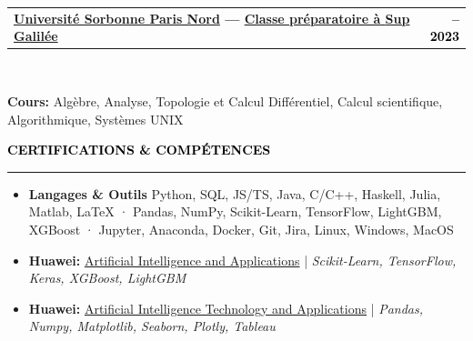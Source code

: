 \documentclass[10pt,english,french]{article}
\makeatletter
\newlength{\mpwidth}
\newcommand{\cvsection}[1]{
    \vspace{4pt}
    \textbf{\fontsize{9pt}{10pt}\selectfont \textcolor{black}{#1}}
    \vspace{6pt}
    \hrule
    \vspace{6pt}
}
\newcommand{\cvtextnotab}[1]{
    \parbox{1\mpwidth}{#1}
}
\newcommand{\cvevent}[2]{
    \vspace{2pt}
    \parbox{\mpwidth}{
        \begin{tabular*}{1\mpwidth}{@{\extracolsep{\fill}} l r}
            \textcolor{black}{\textbf{\fontsize{11}{12}\selectfont #1}} & \textcolor{black}{\textbf{\fontsize{12}{12}\selectfont #2}} \\
        \end{tabular*}\\[-8pt] %
    }
}
\newcommand{\cvsubevent}[2]{
    \parbox{\mpwidth}{
        \begin{tabular*}{1\mpwidth}{@{\extracolsep{\fill}} l r}
            \textcolor{black}{\textit{\fontsize{10}{12}\selectfont #1}} & \textcolor{black}{\textit{\fontsize{10}{12}\selectfont #2}} \\
        \end{tabular*}\\[-8pt] %
    }
    \vspace{-10pt}
}
\makeatother
\begin{document}
\cvevent{\href{https://www.univ-spn.fr}{Université Sorbonne Paris Nord} --- \href{https://www.sup-galilee.univ-paris13.fr/index.php/formation/cp2i/}{Classe préparatoire à \textbf{Sup Galilée}}}{\fontsize{11pt}{11pt}\selectfont 2021\hspace{5pt}--\hspace{5pt}2023}

\vspace{-10pt}
\cvtextnotab{\textbf{Cours\!:} Algèbre, Analyse, Topologie et Calcul Différentiel, Calcul scientifique, Algorithmique, Systèmes UNIX}



\vspace{-12pt}
\cvsection{CERTIFICATIONS \& COMPÉTENCES}

\vspace{-4pt}
\begin{itemize}[leftmargin=0.5cm, label=\textbullet, itemsep=0.2em]
    \item \textbf{Langages \& Outils} Python, SQL, JS/TS, Java, C/C++, Haskell, Julia, Matlab, LaTeX · Pandas, NumPy, Scikit-Learn, TensorFlow, LightGBM, XGBoost · Jupyter, Anaconda, Docker, Git, Jira, Linux, Windows, MacOS
    \item \textbf{Huawei:} \href{https://github.com/DmytroPalahin/cv-latex-simple-en/blob/main/docs/huawei_artificial_intelligence_and_applications.pdf}{Artificial Intelligence and Applications} | \textit{Scikit-Learn, TensorFlow, Keras, XGBoost, LightGBM}
    \item \textbf{Huawei:} \href{https://github.com/DmytroPalahin/cv-latex-simple-en/blob/main/docs/huawei_artificial_intelligence_technology_and_applications.pdf}{Artificial Intelligence Technology and Applications} | \textit{Pandas, Numpy, Matplotlib, Seaborn, Plotly, Tableau}
\end{itemize}
\end{document}
